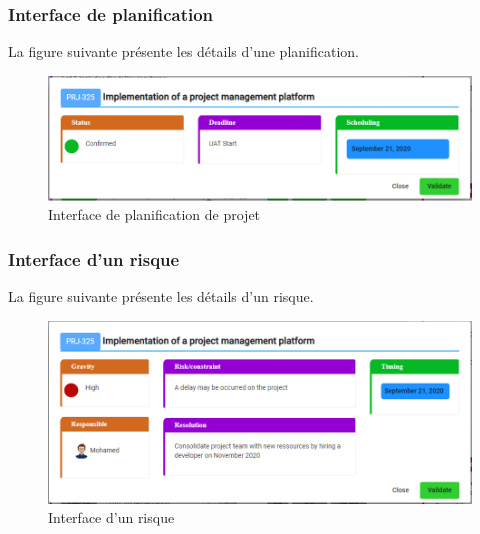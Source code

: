 \subsubsection{Interface de planification}
\hspace{4mm}La figure suivante présente les détails d’une planification.
\begin{figure}[h]
    \centering
    \includegraphics{figures/33anis24.png}
    \caption{Interface de planification de projet}
    \label{fig:interface_planification}
\end{figure}\newpage
\subsubsection{Interface d’un risque }
\hspace{4mm}La figure suivante présente les détails d’un risque.
\begin{figure}[h]
    \centering
    \includegraphics{figures/33anis25.png}
    \caption{Interface d’un risque}
    \label{fig:interface_risque}
\end{figure}\newpage
